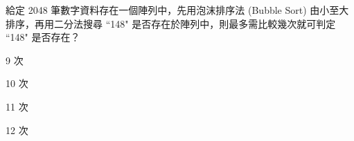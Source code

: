 \ifx\ntpcNinetyTwo\undefined[92學年基北區] \fi
給定 2048 筆數字資料存在一個陣列中，先用泡沫排序法 (Bubble Sort) 由小至大排序，再用二分法搜尋 ``148" 是否存在於陣列中，則最多需比較幾次就可判定 ``148" 是否存在？
  \begin{optionlist}
  \item 9 次	
  \item 10 次
  \item 11 次
  \item 12 次\label{ntpc-92-a11}
  \end{optionlist}